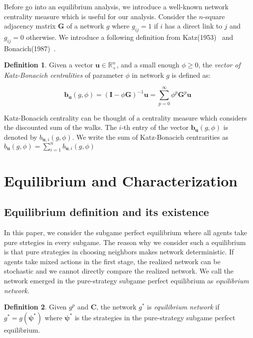 \documentclass[12pt]{article}
\theoremstyle{definition}
\newtheorem{definition}{Definition}
\newcommand{\bm}[1]{\boldsymbol{#1}}
\begin{document}
Before go into an equilibrium analysis, we introduce a well-known network centrality measure which is useful for our analysis.
Consider the $n$-square adjacency matrix $\bm{G}$ of a network $g$ where $g_{ij} = 1$ if $i$ has a direct link to $j$ and $g_{ij} = 0$ otherwise.
We introduce a following definition from Katz(1953)~\cite{katz} and Bonacich(1987)~\cite{bonacich}.

\begin{definition}
Given a vector $\bm{u} \in \mathbb{R}_+^n$, and a small enough $\phi \ge 0$, the {\it{vector of Katz-Bonacich centralities}} of parameter $\phi$ in network $g$ is defined as:

\[ \bm{b}_{\bm{u}}(g, \phi) = {(\bm{I} - \phi \bm{G})}^{-1} \bm{u} = \sum_{p=0}^{\infty} \phi^p \bm{G}^p \bm{u} \]

\end{definition}

Katz-Bonacich centrality can be thought of a centrality measure which considers the discounted sum of the walks.
The $i$-th entry of the vector $\bm{b}_{\bm{u}}(g, \phi)$ is denoted by $b_{\bm{u}, i}(g, \phi)$.
We write the sum of Katz-Bonacich centrarities as $b_{\bm{u}}(g, \phi) = \sum_{i=1}^n b_{\bm{u}, i}(g, \phi)$


\section{Equilibrium and Characterization}


\subsection{Equilibrium definition and its existence}

In this paper, we consider the subgame perfect equilibrium where all agents take pure strtegies in every subgame.
The reason why we consider such a equilibrium is that pure strategies in choosing neighbors makes network deterministic.
If agents take mixed actions in the first stage, the realized network can be stochastic and we cannot directly compare the realized network.
We call the network emerged in the pure-strategy subgame perfect equilibrium as {\it{equilibrium network}}.

\begin{definition}
Given $g^p$ and $\bm{C}$, the network $g^*$ is {\it{equilibrium network}} if $g^* = g(\bm{\psi}^*)$ where $\bm{\psi}^*$ is the strategies in the pure-strategy subgame perfect equilibrium.
\end{definition}
\end{document}

